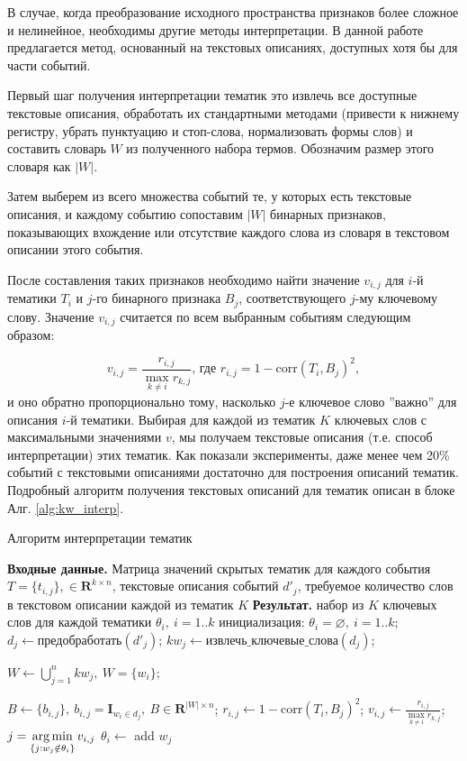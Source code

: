 В случае, когда преобразование исходного пространства признаков более сложное и нелинейное, необходимы другие методы интерпретации.
В данной работе предлагается метод, основанный на текстовых описаниях, доступных хотя бы для части событий.

Первый шаг получения интерпретации тематик это извлечь все доступные текстовые описания, обработать их стандартными методами (привести к нижнему регистру, убрать пунктуацию и стоп-слова, нормализовать формы слов) и составить словарь $W$ из полученного набора термов. Обозначим размер этого словаря как $|W|$.

Затем выберем из всего множества событий те, у которых есть текстовые описания, и каждому событию сопоставим $|W|$ бинарных признаков, показывающих вхождение или отсутствие каждого слова из словаря в текстовом описании этого события.

После составления таких признаков необходимо найти значение $v_{i,j}$ для $i$-й тематики $T_i$ и $j$-го бинарного признака  $B_j$, соответствующего $j$-му ключевому слову. Значение $v_{i,j}$ считается по всем выбранным событиям следующим образом:  

$$
v_{i,j} = \frac{r_{i,j}}{\max\limits_{k \neq i} r_{k,j}}\mbox{, где }
r_{i,j} = 1 - \mbox{corr}(T_i, B_j)^2,$$ и оно обратно пропорционально тому, насколько $j$-е ключевое слово ''важно'' для описания $i$-й тематики. Выбирая для каждой из тематик $K$ ключевых слов с максимальными значениями $v$, мы получаем текстовые описания (т.е. способ интерпретации) этих тематик.
Как показали эксперименты, даже менее чем 20\% событий с текстовыми описаниями достаточно для построения описаний тематик. Подробный алгоритм получения текстовых описаний для тематик описан в блоке Алг. \ref{alg:kw_interp}.


\begin{algorithm}
    \caption{Алгоритм интерпретации тематик}\label{alg:kw_interp}
    \begin{algorithmic}
    \STATE \textbf{Входные данные.} Матрица значений скрытых тематик для каждого события $T = \{t_{i,j}\}, \in \mathbf{R}^{k \times n}$, текстовые описания событий $d'_j$, требуемое количество слов в текстовом описании каждой из тематик $K$
    \STATE \textbf{Результат.} набор из $K$ ключевых слов для каждой тематики $\theta_i,\ i=1..k$
    \STATE инициализация: $\theta_i = \varnothing,\ i=1..k$;
        \STATE $d_j \gets \mbox{предобработать}(d'_j)$;
        \STATE $kw_j \gets \mbox{извлечь\_ключевые\_слова}(d_j)$;
    \ENDFOR
    \item $W \gets \bigcup\limits_{j=1}^n kw_j, \ W=\{w_i\}$;
    \item $B \gets \{b_{i,j}\},\ b_{i,j} = \mathbf{I}_{w_i \in d_j},\ B \in \mathbf{R}^{|W| \times n}$;
            \STATE $r_{i,j} \gets 1 - \mbox{corr}(T_i, B_j)^2$;
            \STATE $v_{i,j} \gets \frac{r_{i,j}}{\max\limits_{k \neq i} r_{k,j}}$;
        \ENDFOR
    \ENDFOR
        \STATE $j=\operatorname*{arg\,min}\limits_{\{j: w_j \notin \theta_i\}} v_{i,j}$\;
        \STATE $\theta_i \gets$ add $w_j$\;
    \ENDFOR
    \end{algorithmic}
\end{algorithm}


